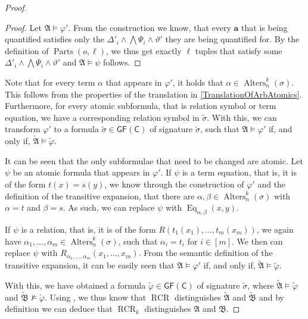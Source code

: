 \documentclass[a4paper,11pt,DIV=15]{scrartcl} %
\renewcommand{\phi}{\varphi}
\theoremstyle{plain}
\theoremstyle{definition}
\newcommand{\GFC}{\mathsf{GF}(\mathsf{C})}
\newcommand{\RCR}{\operatorname{RCR}}
\renewcommand{\theta}{\vartheta}
\begin{document}
\begin{proof}
\begin{proof}
		Let $\mathfrak A\models \phi'$.
		From the construction we know, that every $\mathbf a$ that is being quantified satisfies only the $\Delta'_i\land\bigwedge\Psi_i\land\theta'$ they are being quantified for.
		By the definition of $\operatorname{Parts}(o,\ell)$, we thus get exactly $\ell$ tuples that satisfy some $\Delta'_i\land\bigwedge\Psi_i\land\theta'$ and $\mathfrak A\models \psi$ follows.
	\end{proof}
	
	Note that for every term $\alpha$ that appears in $\phi'$, it holds that $\alpha\in \operatorname{Alters}^k_n(\sigma)$.
	This follows from the properties of the translation in \cref{TranslationOfArbAtomics}.
	Furthermore, for every atomic subformula, that is relation symbol or term equation, we have a corresponding relation symbol in $\widetilde{\sigma}$.
	With this, we can transform $\phi'$ to a formula $\widetilde{\sigma}\in\GFC$ of signature $\widetilde{\sigma}$, such that $\mathfrak A\models \phi'$ if, and only if, $\widetilde{\mathfrak A}\models \widetilde{\phi}$.
	
	It can be seen that the only subformulae that need to be changed are atomic.
	Let $\psi$ be an atomic formula that appears in $\phi'$.
	If $\psi$ is a term equation, that is, it is of the form $t(x)=s(y)$, we know through the construction of $\phi'$ and the definition of the transitive expansion, that there are $\alpha,\beta\in \operatorname{Alters}^k_n(\sigma)$ with $\alpha=t$ and $\beta=s$. 
	As such, we can replace $\psi$ with $\operatorname{Eq}_{\alpha,\beta}(x,y)$.
	
	If $\psi$ is a relation, that is, it is of the form $R(t_1(x_1),\dots,t_m(x_m))$, we again have $\alpha_1,\dots,\alpha_m\in \operatorname{Alters}^k_n(\sigma)$, such that $\alpha_i=t_i$ for $i\in[m]$.
	We then can replace $\psi$ with $R_{\alpha_1,\dots,\alpha_m}(x_1,\dots,x_m)$.
	From the semantic definition of the transitive expansion, it can be easily seen that $\mathfrak A\models \phi'$ if, and only if, $\widetilde{\mathfrak A}\models \widetilde{\phi}$.
		
	With this, we have obtained a formula $\widetilde{\phi}\in\GFC$ of signature $\widetilde{\sigma}$, where $\widetilde{\mathfrak A}\models \widetilde{\phi}$ and $\widetilde{\mathfrak B}\not\models \widetilde{\phi}$.
	Using \cite{scheidt2025ColorRefinement}, we thus know that $\RCR$ distinguishes $\widetilde{\mathfrak A}$ and $\widetilde{\mathfrak B}$ and by definition we can deduce that $\RCR_k$ distinguishes $\mathfrak A$ and $\mathfrak B$.
\end{proof}
\end{document}
